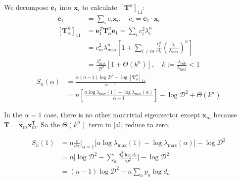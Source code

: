 \documentclass[11pt, letters]{article}
\begin{document}
We decompose $\bm e_1$ into $\bm x_i$ to calculate $[\bm{T}^n]_{11}$:
\begin{align}
\bm e_1&=\sum_i c_i\bm x_i,\quad c_i=\bm e_1\cdot \bm x_i\\
[\bm{T}_\alpha^n]_{11}&=\bm{e}_1^T\bm{T}_\alpha^n \bm{e}_1=\sum_i c_i^2\lambda_i^n\\
&=c_m^2\lambda_{\max}^n\left[1+\sum_{i\neq m}\frac{c_i^2}{c_m^2}\left( \frac{\lambda_i}{\lambda_{\max}}\right) ^n\right]\\
&=\frac{\lambda_{\max}^n}{\mathcal{D}^2}\left[1+\Theta(k^n)\right],\quad k:=\frac{\lambda_{\mathrm{sub}}}{\lambda_{\max}}<1
\end{align}
\begin{align}
S_n(\alpha)&=\frac{\alpha(n-1)\log \mathcal{D}^2-\log [\bm{T}_\alpha^n]_{11}}{\alpha-1}\\
&=n\left[\frac{\alpha\log \lambda_{\max}(1)-\log \lambda_{\max}(\alpha)}{\alpha-1}\right]-\log \mathcal{D}^2+\Theta(k^n)\label{al}
\end{align}

In the $\alpha=1$ case, there is no other nontrivial eigenvector except $\bm x_m$ because $\bm T=\bm x_m\bm x_m^\mathsf{T}$. So the $\Theta(k^n)$ term in \ref{al} reduce to zero.

\begin{align}
S_{n}(1)&=n\frac{\dd}{\dd\alpha}\Big|_{\alpha=1}\Big[\alpha\log \lambda_{\max}(1)-\log \lambda_{\max}(\alpha)\Big] -\log \mathcal{D}^2\\
&=n\Big[\log \mathcal{D}^2-\sum_a \frac{d_a^2\log d_a}{\mathcal{D}^2}\Big]-\log \mathcal{D}^2\\
&=(n-1)\log \mathcal{D}^2-n\sum_a p_a\log d_a
\end{align}
\end{document}
